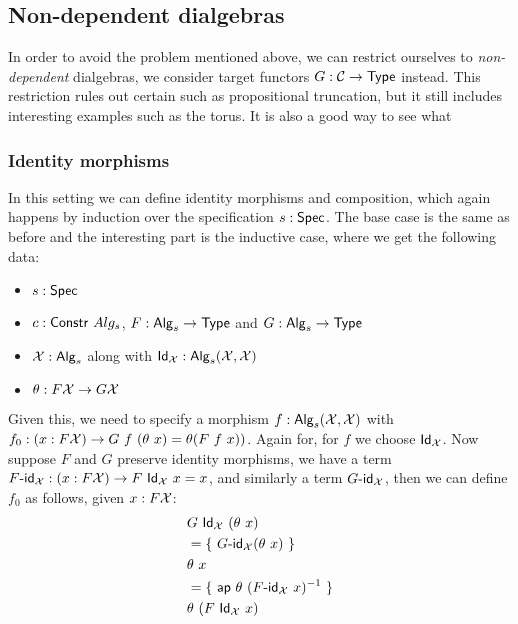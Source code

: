 \documentclass[a4paper,10pt]{article}
\begin{document}
\subsection{Non-dependent dialgebras}
\label{sec:nondepdialg}

In order to avoid the problem mentioned above, we can restrict
ourselves to \emph{non-dependent} dialgebras, \ie we consider target
functors $G : \mathcal{C} \to \mathsf{Type}$ instead. This restriction rules out
certain \hits such as propositional truncation, but it still includes
interesting examples such as the torus. It is also a good way to see
what 

\subsubsection{Identity morphisms}

In this setting we can define
identity morphisms and composition, which again happens by induction
over the specification $s : \mathsf{Spec}$. The base case is the same as
before and the interesting part is the inductive case, where we get
the following data:
%
\begin{itemize}
\item $s : \mathsf{Spec}$ 
\item $c : \mathsf{Constr}\ Alg_s$, \ie $F : \mathsf{Alg}_s \to \mathsf{Type}$ and $G : \mathsf{Alg}_s \to \mathsf{Type}$
\item $\mathcal{X} : \mathsf{Alg}_s$ along with
  $\mathsf{Id}_{\mathcal{X}} : \mathsf{Alg}_s (\mathcal{X},\mathcal{X})$
\item  $\theta : F \mathcal{X} \to G \mathcal{X}$
\end{itemize}
%
Given this, we need to specify a morphism
$f : \mathsf{Alg}_s (\mathcal{X},\mathcal{X})$ with
$f_0 : (x : F \mathcal{X}) \to G\ f\ (\theta\ x) = \theta (F\ f\ x))$.
Again for, for $f$ we choose $\mathsf{Id}_{\mathcal{X}}$. Now suppose $F$ and $G$
preserve identity morphisms, \ie we have a term
$\Fid_{\alg{X}} : (x : F \alg{X}) \to F\ \Id{\alg{X}}\ x = x$, and
similarly a term $G\mbox{-}\mathsf{id}_{\mathcal{X}}$, then we can define $f_0$ as
follows, given $x : F \mathcal{X}$:
%
\begin{align*}
  &G\ \mathsf{Id}_{\mathcal{X}}\ (\theta\ x) \\
  &= \{\ G\mbox{-}\mathsf{id}_{\mathcal{X}} (\theta\ x)\ \} \\
  &\theta\ x \\
  &= \{\ \mathsf{ap}\ \theta\ (F\mbox{-}\mathsf{id}_{\mathcal{X}}\ x)^{-1}\ \} \\
  &\theta\ (F\ \mathsf{Id}_{\mathcal{X}}\ x)
\end{align*}
%
\end{document}
